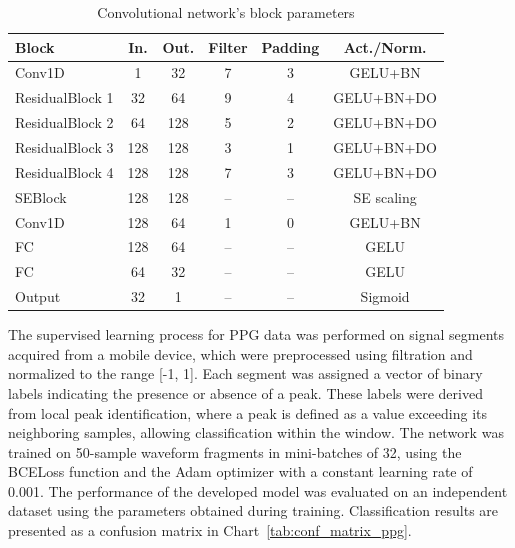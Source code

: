 \documentclass[journal]{IEEEtran}
\begin{document}
\begin{table}[ht]
\centering
\caption{Convolutional network's block parameters}
\label{tab:ppg_layers}
\begin{tabular}{|l|c|c|c|c|c|}
\hline
\textbf{Block} & \textbf{In.} & \textbf{Out.} & \textbf{Filter} & \textbf{Padding} & \textbf{Act./Norm.} \\
\hline
Conv1D & 1 & 32 & 7 & 3 & GELU+BN \\
ResidualBlock 1 & 32 & 64 & 9 & 4 & GELU+BN+DO \\
ResidualBlock 2 & 64 & 128 & 5 & 2 & GELU+BN+DO \\
ResidualBlock 3 & 128 & 128 & 3 & 1 & GELU+BN+DO\\
ResidualBlock 4 & 128 & 128 & 7 & 3 & GELU+BN+DO \\
SEBlock & 128 & 128 & – & – & SE scaling \\
Conv1D  & 128 & 64 & 1 & 0 & GELU+BN \\
FC & 128 & 64 & – & – & GELU \\
FC & 64 & 32 & – & – & GELU \\
Output & 32 & 1 & – & – & Sigmoid \\
\hline
\end{tabular}
\end{table}

The supervised learning process for PPG data was performed on signal segments acquired from a mobile device, which were preprocessed using filtration and normalized to the range [-1, 1]. Each segment was assigned a vector of binary labels indicating the presence or absence of a peak. These labels were derived from local peak identification, where a peak is defined as a value exceeding its neighboring samples, allowing classification within the window. The network was trained on 50-sample waveform fragments in mini-batches of 32, using the BCELoss function and the Adam optimizer with a constant learning rate of 0.001. The performance of the developed model was evaluated on an independent dataset using the parameters obtained during training. Classification results are presented as a confusion matrix in Chart~\ref{tab:conf_matrix_ppg}.
\end{document}
